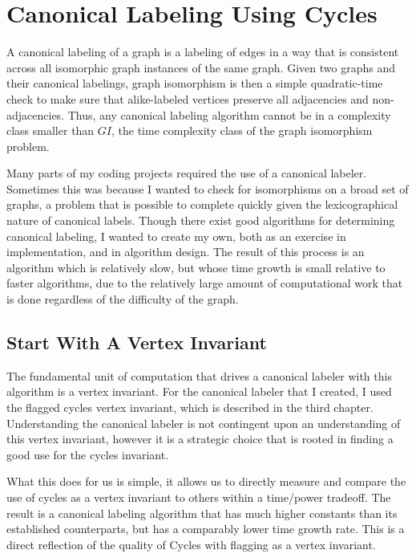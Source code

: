 \chapter{Canonical Labeling Using Cycles}

A canonical labeling of a graph is a labeling of edges in a way that is consistent across all isomorphic graph instances of the same graph.
Given two graphs and their canonical labelings, graph isomorphism is then a simple quadratic-time check to make sure that alike-labeled vertices preserve all adjacencies and non-adjacencies. 
Thus, any canonical labeling algorithm cannot be in a complexity class smaller than $GI$, the time complexity class of the graph isomorphism problem.

Many parts of my coding projects required the use of a canonical labeler.
Sometimes this was because I wanted to check for isomorphisms on a broad set of graphs, a problem that is possible to complete quickly given the lexicographical nature of canonical labels.
Though there exist good algorithms for determining canonical labeling, I wanted to create my own, both as an exercise in implementation, and in algorithm design.
The result of this process is an algorithm which is relatively slow, but whose time growth is small relative to faster algorithms, due to the relatively large amount of computational work that is done regardless of the difficulty of the graph.

\section{Start With A Vertex Invariant}

The fundamental unit of computation that drives a canonical labeler with this algorithm is a vertex invariant.
For the canonical labeler that I created, I used the flagged cycles vertex invariant, which is described in the third chapter.
Understanding the canonical labeler is not contingent upon an understanding of this vertex invariant, however it is a strategic choice that is rooted in finding a good use for the cycles invariant.

What this does for us is simple, it allows us to directly measure and compare the use of cycles as a vertex invariant to others within a time/power tradeoff.
The result is a canonical labeling algorithm that has much higher constants than its established counterparts, but has a comparably lower time growth rate. 
This is a direct reflection of the quality of Cycles with flagging as a vertex invariant.


